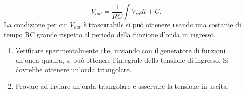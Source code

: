 \begin{equation}
    V_{out}=\frac{1}{RC}\int V_{in}dt+C.
\end{equation}
La condizione per cui $V_{out}$ è trascurabile si può ottenere usando una costante di tempo RC grande rispetto al periodo della funzione d'onda in ingresso.
\begin{enumerate}
    \item Verificare sperimentalmente che, inviando con il generatore di funzioni un'onda quadra, si può ottenere l'integrale della tensione di ingresso. Si dovrebbe ottenere un'onda triangolare.
    \item Provare ad inviare un'onda triangolare e osservare la tensione in uscita.
\end{enumerate}

\setcounter{section}{0}
\renewcommand\thesection{\Alph{section}}

